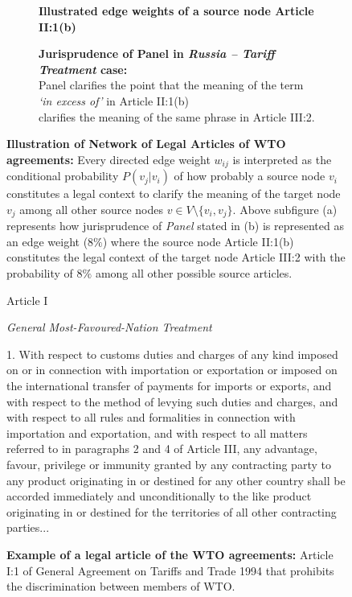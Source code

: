 \begin{figure}[]
    \captionsetup[subfigure]{justification=centering}
    \begin{subfigure}[b]{1\textwidth}
        \centering{
            
        }
        \caption{\textbf{Illustrated edge weights of a source node Article II:1(b)}}
        \label{subfig:a:art2b}
    \end{subfigure}
    \vfill
    \begin{subfigure}[b]{1\textwidth}
        \centering{
            
        }
        \centering
        \caption{\textbf{Jurisprudence of Panel in \textit{Russia – Tariff Treatment} case:} \\ Panel clarifies the point that the meaning of the term \textit{`in excess of'} in Article II:1(b) \\ clarifies the meaning of the same phrase in Article III:2.}
        \label{subfig:a:condprob}
    \end{subfigure}
    \caption{\textbf{Illustration of Network of Legal Articles of WTO agreements: }Every directed edge weight $w_{ij}$ is interpreted as the conditional probability $P(v_j|v_i)$ of how probably a source node $v_i$ constitutes a legal context to clarify the meaning of the target node $v_j$ among all other source nodes $v\in V \setminus \{v_i, v_{j}\}$. Above subfigure (a) represents how jurisprudence of \textit{Panel} stated in (b) is represented as an edge weight ($8\%$) where the source node Article II:1(b) constitutes the legal context of the target node Article III:2 with the probability of $8\%$ among all other possible source articles.}
    \label{fig:def-example}
\end{figure}



\begin{figure}[]
    \begin{center}
        Article I
    \end{center}
    \begin{center}
        \textit{General Most-Favoured-Nation Treatment}
    \end{center}
    1. With respect to customs duties and charges of any kind imposed on or in connection
    with importation or exportation or imposed on the international transfer of payments for
    imports or exports, and with respect to the method of levying such duties and charges, and
    with respect to all rules and formalities in connection with importation and exportation, and
    with respect to all matters referred to in paragraphs 2 and 4 of Article III, any advantage,
    favour, privilege or immunity granted by any contracting party to any product originating in
    or destined for any other country shall be accorded immediately and unconditionally to the
    like product originating in or destined for the territories of all other contracting parties...
    \caption{\textbf{Example of a legal article of the WTO agreements:} Article I:1 of General Agreement on Tariffs and Trade 1994 that prohibits the discrimination between members of WTO.}
    \label{fig:gatt_art1}
\end{figure}
